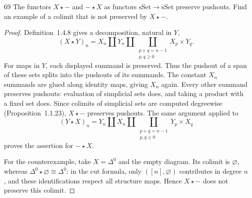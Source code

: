 \begin{exercise}{69}
The functors $X\star-$ and $-\star X$ as functors $\mathrm{sSet}\to\mathrm{sSet}$ preserve pushouts. Find
an example of a colimit that is not preserved by $X\star-$.

\begin{proof}
Definition~1.4.8 gives a decomposition, natural in $Y$,
\[
 (X\star Y)_n
 =X_n\amalg Y_n\amalg
   \coprod_{\substack{p+q=n-1\\p,q\ge0}}X_p\times Y_q.
\]
For maps in $Y$, each displayed summand is preserved.
Thus the pushout of a span of these sets splits into
the pushouts of its summands.
The constant $X_n$ summands are glued along identity
maps, giving $X_n$ again.
Every other summand preserves pushouts: evaluation of
simplicial sets does, and taking a product with a fixed
set does.
Since colimits of simplicial sets are computed degreewise
(Proposition~1.1.23), $X\star-$ preserves pushouts.
The same argument applied to
\[
 (Y\star X)_n
 =Y_n\amalg X_n\amalg
   \coprod_{\substack{p+q=n-1\\p,q\ge0}}Y_p\times X_q
\]
proves the assertion for $-\star X$.

For the counterexample, take $X=\Delta^0$ and the empty
diagram.
Its colimit is $\varnothing$, whereas
$\Delta^0\star\varnothing\cong\Delta^0$:
in the cut formula, only $([n],\varnothing)$ contributes
in degree $n$, and these identifications respect all
structure maps.
Hence $X\star-$ does not preserve this colimit.
\end{proof}
\end{exercise}

